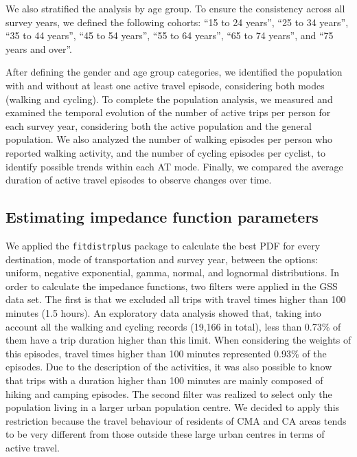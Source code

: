\documentclass[preprint, 3p,
authoryear]{elsarticle} %
\begin{document}
We also stratified the analysis by age group. To ensure the consistency
across all survey years, we defined the following cohorts: ``15 to 24
years'', ``25 to 34 years'', ``35 to 44 years'', ``45 to 54 years'',
``55 to 64 years'', ``65 to 74 years'', and ``75 years and over''.

After defining the gender and age group categories, we identified the
population with and without at least one active travel episode,
considering both modes (walking and cycling). To complete the population
analysis, we measured and examined the temporal evolution of the number
of active trips per person for each survey year, considering both the
active population and the general population. We also analyzed the
number of walking episodes per person who reported walking activity, and
the number of cycling episodes per cyclist, to identify possible trends
within each AT mode. Finally, we compared the average duration of active
travel episodes to observe changes over time.

\subsection{Estimating impedance function
parameters}\label{estimating-impedance-function-parameters}

We applied the \texttt{fitdistrplus} package
\citep{delignette2015fitdistrplus} to calculate the best PDF for every
destination, mode of transportation and survey year, between the
options: uniform, negative exponential, gamma, normal, and lognormal
distributions. In order to calculate the impedance functions, two
filters were applied in the GSS data set. The first is that we excluded
all trips with travel times higher than 100 minutes (1.5 hours). An
exploratory data analysis showed that, taking into account all the
walking and cycling records (19,166 in total), less than 0.73\% of them
have a trip duration higher than this limit. When considering the
weights of this episodes, travel times higher than 100 minutes
represented 0.93\% of the episodes. Due to the description of the
activities, it was also possible to know that trips with a duration
higher than 100 minutes are mainly composed of hiking and camping
episodes. The second filter was realized to select only the population
living in a larger urban population centre. We decided to apply this
restriction because the travel behaviour of residents of CMA and CA
areas tends to be very different from those outside these large urban
centres in terms of active travel.
\end{document}
